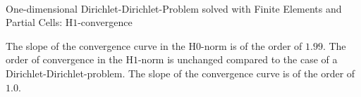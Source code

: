 \documentclass[a4paper,12pt]{article}
\makeatletter
\newenvironment{figurehere}
  {\def\@captype{figure}}
  {}
\makeatother
\begin{document}
\begin{center}
\begin{figurehere}
\\
\caption{One-dimensional Dirichlet-Dirichlet-Problem solved with Finite Elements and Partial Cells: H$1$-convergence}\label{fig:femdirichlet1dH1}
\end{figurehere}
\end{center}
The slope of the convergence curve in the H$0$-norm is of the order of $1.99$.  The order of convergence in the H$1$-norm is unchanged compared to the case of a Dirichlet-Dirichlet-problem.
The slope of the convergence curve is of the order of $1.0$.
\end{document}
